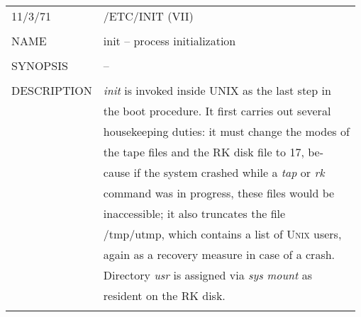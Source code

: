 \documentclass{article}
\newenvironment{manpage}{\ttfamily}{\par}
\begin{document}
\begin{manpage}
	
	\begin{longtable}{ll}
		11/3/71 & \hspace{17em}/ETC/INIT (VII)\\\\
		
		NAME & init -- process initialization\\\\
		
		SYNOPSIS & --\\\\
		
		DESCRIPTION & \textit{init} is invoked inside UNIX as the last step in\\
		& the boot procedure. It first carries out several\\
		& housekeeping duties: it must change the modes of\\
		& the tape files and the RK disk file to 17, be-\\
		& cause if the system crashed while a \textit{tap} or \textit{rk}\\
		& command was in progress, these files would be\\
		& inaccessible; it also truncates the file\\
		& /tmp/utmp, which contains a list of U\textsc{nix} users,\\
		& again as a recovery measure in case of a crash.\\
		& Directory \textit{usr} is assigned via \textit{sys} \textit{mount} as\\
		& resident on the RK disk.\\\\
		

\end{longtable}
\end{manpage}
\end{document}
